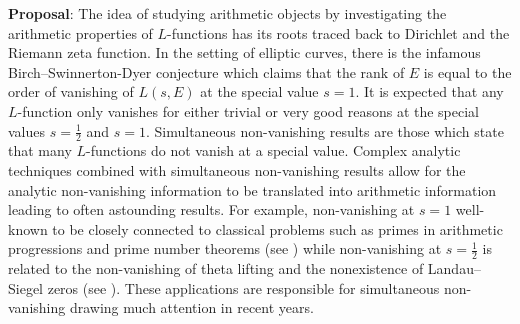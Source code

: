 \documentclass[12pt,reqno,oneside]{amsart}
\begin{document}
\textbf{Proposal}: The idea of studying arithmetic objects by investigating the arithmetic properties of $L$-functions has its roots traced back to Dirichlet and the Riemann zeta function. In the setting of elliptic curves, there is the infamous Birch–Swinnerton-Dyer conjecture which claims that the rank of $E$ is equal to the order of vanishing of $L(s,E)$ at the special value $s = 1$. It is expected that any $L$-function only vanishes for either trivial or very good reasons at the special values $s = \frac{1}{2}$ and $s = 1$. Simultaneous non-vanishing results are those which state that many $L$-functions do not vanish at a special value. Complex analytic techniques combined with simultaneous non-vanishing results allow for the analytic non-vanishing information to be translated into arithmetic information leading to often astounding results. For example, non-vanishing at $s = 1$ well-known to be closely connected to classical problems such as primes in arithmetic progressions and prime number theorems (see \cite{M}) while non-vanishing at $s = \frac{1}{2}$ is related to the non-vanishing of theta lifting and the nonexistence of Landau–Siegel zeros (see \cite{Da}). These applications are responsible for simultaneous non-vanishing drawing much attention in recent years.
\end{document}
